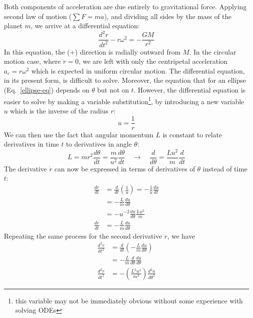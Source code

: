 \documentclass{../../../oss-handout}
\begin{document}
Both components of acceleration are due entirely to gravitational force.
Applying second law of motion ($\sum F=ma$), and dividing all sides by the mass
of the planet $m$, we arrive at a differential equation:
\begin{equation}
  \frac{d^2r}{dt^2}-r\omega^2=-\frac{GM}{r^2}
  \label{ode1}
\end{equation}
In this equation, the ($+$) direction is radially outward from $M$. In the
circular motion case, where $\ddot{r}=0$, we are left with only the centripetal
acceleration
$a_c=r\omega^2$ which is expected in uniform circular motion. The differential
equation, in its present form, is difficult to solve. Moreover, the equation
that for an ellipse (Eq.~\ref{ellipse-eq}) depends on $\theta$ but not on $t$.
However, the
differential equation is easier to solve by making a variable
substitution\footnote{this variable may not be immediately obvious without
  some experience with solving ODEs}, by introducing a new variable $u$ which
is the inverse of the radius $r$:
\begin{equation}
  u=\frac{1}{r}
\end{equation}
We can then use the fact that angular momentum $L$ is constant to relate
derivatives in time $t$ to derivatives in angle $\theta$:
\begin{equation}
  L=mr^2\frac{d\theta}{dt}=\frac{m}{u^2}\frac{d\theta}{dt}
  \quad\longrightarrow\quad
  \frac{d}{d\theta}=\frac{Lu^2}{m}\frac{d}{dt}
\end{equation}
The derivative $\dot{r}$ can now be expressed in terms of derivatives of
$\theta$ instead of time $t$:
\begin{align}
  \nonumber
  \frac{dr}{dt} &=\frac{d}{dt}\left(\frac{1}{u}\right)
  =-\frac{1}{u}\frac{du}{dt}\\
  \nonumber
  &=-\frac{L}{m}\frac{du}{d\theta}\\
  \nonumber
  &= -u^{-2}\frac{du}{d\theta} \frac{Lu^2}{m} \\
  \frac{dr}{dt}&= -\frac{L}{m}\frac{du}{d\theta}
\end{align}
Repeating the same process for the second derivative $\ddot{r}$, we have
\begin{align}
  \nonumber
  \frac{d^2r}{dt^2} &= \frac{d}{dt}\left(-\frac{L}{m}\frac{du}{d\theta}\right)\\
  \nonumber
  &= -\frac{L}{m} \frac{d}{d\theta}\frac{du}{d\theta} \\
  \frac{d^2r}{dt^2}&= -\left(\frac{L^2u^2}{m^2}\right)\frac{d^2u}{d\theta^2}
\end{align}
\end{document}
